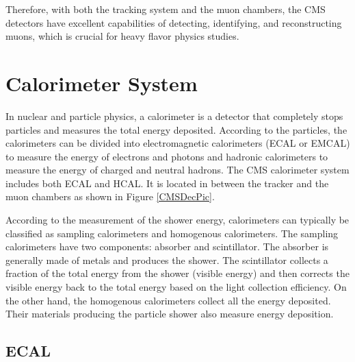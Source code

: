 
Therefore, with both the tracking system and the muon chambers, the CMS detectors have excellent capabilities of detecting, identifying, and reconstructing muons, which is crucial for heavy flavor physics studies.

\section{Calorimeter System}

In nuclear and particle physics, a calorimeter is a detector that completely stops particles and measures the total energy deposited. According to the particles, the calorimeters can be divided into electromagnetic calorimeters (ECAL or EMCAL) to measure the energy of electrons and photons and hadronic calorimeters to measure the energy of charged and neutral hadrons. The CMS calorimeter system includes both ECAL and HCAL. It is located in between the tracker and the muon chambers as shown in Figure \ref{CMSDecPic}. 

According to the measurement of the shower energy, calorimeters can typically be classified as sampling calorimeters and homogenous calorimeters. The sampling calorimeters have two components: absorber and scintillator. The absorber is generally made of metals and produces the shower. The scintillator collects a fraction of the total energy from the shower (visible energy) and then corrects the visible energy back to the total energy based on the light collection efficiency. On the other hand, the homogenous calorimeters collect all the energy deposited. Their materials producing the particle shower also measure energy deposition. 

\subsection{ECAL}

